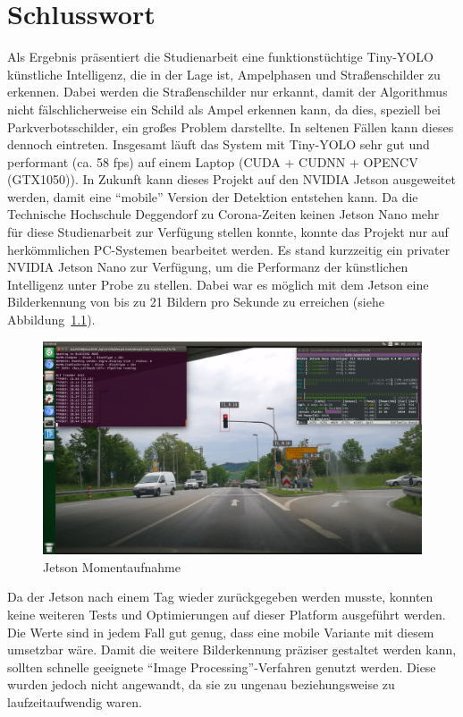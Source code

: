 \documentclass[a4paper,oneside,12pt]{report}
\begin{document}
	\chapter{Schlusswort}
	\begin{onehalfspace}
		Als Ergebnis präsentiert die Studienarbeit eine funktionstüchtige Tiny-YOLO künstliche Intelligenz, die in der Lage ist, Ampelphasen und Straßenschilder zu erkennen. Dabei werden die Straßenschilder nur erkannt, damit der Algorithmus nicht fälschlicherweise ein Schild als Ampel erkennen kann, da dies, speziell bei Parkverbotsschilder, ein großes Problem darstellte. In seltenen Fällen kann dieses dennoch eintreten. Insgesamt läuft das System mit Tiny-YOLO sehr gut und performant (ca. 58 fps) auf einem Laptop (CUDA + CUDNN + OPENCV (GTX1050)). In Zukunft kann dieses Projekt auf den NVIDIA Jetson ausgeweitet werden, damit eine "`mobile"' Version der Detektion entstehen kann. Da die Technische Hochschule Deggendorf zu Corona-Zeiten keinen Jetson Nano mehr für diese Studienarbeit zur Verfügung stellen konnte, konnte das Projekt nur auf herkömmlichen PC-Systemen bearbeitet werden. Es stand kurzzeitig ein privater NVIDIA Jetson Nano zur Verfügung, um die Performanz der künstlichen Intelligenz unter Probe zu stellen. Dabei war es möglich mit dem Jetson eine Bilderkennung von bis zu 21 Bildern pro Sekunde zu erreichen (siehe Abbildung~\ref{fig:Jetson}).
		\begin{figure}[h!]
			\includegraphics[width=\linewidth]{Jetson.png}
			\caption{Jetson Momentaufnahme}
			\label{fig:Jetson}
		\end{figure}
		Da der Jetson nach einem Tag wieder zurückgegeben werden musste, konnten keine weiteren Tests und Optimierungen auf dieser Platform ausgeführt werden. Die Werte sind in jedem Fall gut genug, dass eine mobile Variante mit diesem umsetzbar wäre. Damit die weitere Bilderkennung präziser gestaltet werden kann, sollten schnelle geeignete "`Image Processing"'-Verfahren genutzt werden. Diese wurden jedoch nicht angewandt, da sie zu ungenau beziehungsweise zu laufzeitaufwendig waren.
	\end{onehalfspace}
	
\end{document}
